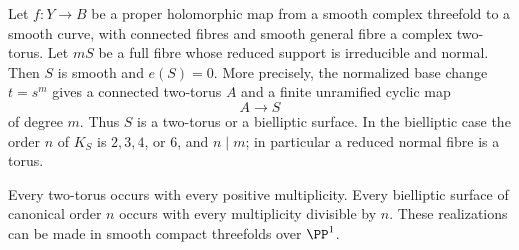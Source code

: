 
\begin{proposition}\label{cdp:st:C.2.UN.5}
Let $f:Y\to B$ be a proper holomorphic map from a smooth
complex threefold to a smooth curve, with connected fibres
and smooth general fibre a complex two-torus. Let $mS$ be
a full fibre whose reduced support is irreducible and normal.
Then $S$ is smooth and $e(S)=0$. More precisely, the
normalized base change $t=s^m$ gives a connected two-torus
$A$ and a finite unramified cyclic map
\[
                         A\longrightarrow S
\]
of degree $m$. Thus $S$ is a two-torus or a bielliptic
surface. In the bielliptic case the order $n$ of $K_S$ is
$2,3,4$, or $6$, and $n\mid m$; in particular a reduced
normal fibre is a torus.

Every two-torus occurs with every positive multiplicity.
Every bielliptic surface of canonical order $n$ occurs
with every multiplicity divisible by $n$. These
realizations can be made in smooth compact threefolds
over $\PP^1$.
\end{proposition}
